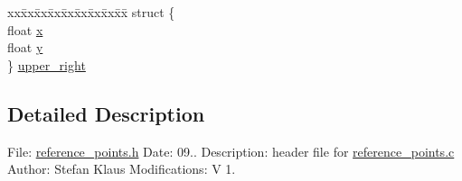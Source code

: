 \begin{DoxyCompactItemize}
\begin{tabbing}
\end{tabbing}\item 
\begin{tabbing}
xx\=xx\=xx\=xx\=xx\=xx\=xx\=xx\=xx\=\kill
struct \{\\
\>float \hyperlink{structreference_pos_a515603c98b53f93684950b9343f0e80f}{x}\\
\>float \hyperlink{structreference_pos_ae4599fc96bf90c0748eaea09f64bc304}{y}\\
\} \hyperlink{structreference_pos_ab17d901d1b64895e79f41e35cb7c6649}{upper\_right}\\

\end{tabbing}\end{DoxyCompactItemize}


\subsection{Detailed Description}
File\+: \hyperlink{reference__points_8h}{reference\+\_\+points.\+h} Date\+: 09.. Description\+: header file for \hyperlink{reference__points_8c}{reference\+\_\+points.\+c} Author\+: Stefan Klaus Modifications\+: V 1. 

